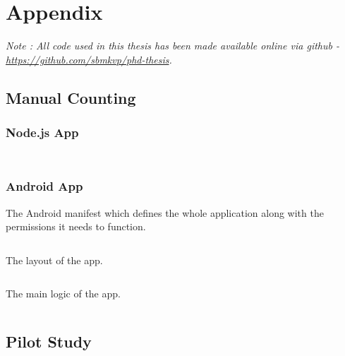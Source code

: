 \chapter{Appendix}

\vspace*{\fill}

\textit{Note : All code used in this thesis has been made available online via github - \url{https://github.com/sbmkvp/phd-thesis}.}

\cleardoublepage

\section{Manual Counting}

\subsection{Node.js App} \label{appendix:manualcount}
\vspace{1em}
\inputminted{javascript}{tools/manual-count/package.json}
\inputminted{javascript}{tools/manual-count/manualcount.js}

\subsection{Android App} \label{appendix:clicker}
\vspace{1em}
The Android manifest which defines the whole application along with the permissions it needs to function.
\inputminted{xml}{tools/clicker/manifest.xml}
\vspace{1em}
The layout of the app.
\inputminted{xml}{tools/clicker/layout.xml}
\vspace{1em}
The main logic of the app.
\inputminted{java}{tools/clicker/activity.java}
\pagebreak

\section{Pilot Study}

